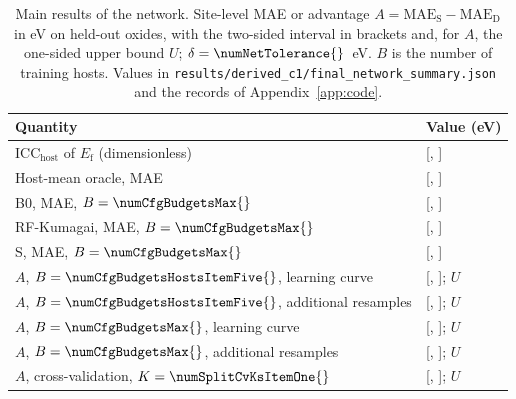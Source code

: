 \begin{table}[H]
\caption{Main results of the network. Site-level MAE or advantage $A = \mathrm{MAE}_\mathrm{S} - \mathrm{MAE}_\mathrm{D}$ in eV on held-out oxides, with the two-sided \pctci{} interval in brackets and, for $A$, the one-sided upper bound $U$; $\delta = \numNetTolerance{}$~eV. $B$ is the number of training hosts. Values in \texttt{results/derived\_c1/final\_network\_summary.json} and the records of Appendix~\ref{app:code}.\label{tab:headline}}
\centering
\small
\begin{tabularx}{\linewidth}{Xl}
\toprule
Quantity & Value (eV) \\
\midrule
$\mathrm{ICC}_\mathrm{host}$ of $E_\mathrm{f}$ (dimensionless) & \numVarianceDecompositionHostIcc{} [\numVarianceDecompositionHostIccCiLo{}, \numVarianceDecompositionHostIccCiHi{}] \\
Host-mean oracle, MAE & \numHostMeanOracleAggregateMaeMean{} [\numHostMeanOracleAggregateMaeCiLo{}, \numHostMeanOracleAggregateMaeCiHi{}] \\
B0, MAE, $B = \numCfgBudgetsMax{}$ & \numNetSixHundredFiftyFourMaeBZero{} [\numNetSixHundredFiftyFourMaeBZeroLo{}, \numNetSixHundredFiftyFourMaeBZeroHi{}] \\
RF-Kumagai, MAE, $B = \numCfgBudgetsMax{}$ & \numNetSixHundredFiftyFourMaeRf{} [\numNetSixHundredFiftyFourMaeRfLo{}, \numNetSixHundredFiftyFourMaeRfHi{}] \\
S, MAE, $B = \numCfgBudgetsMax{}$ & \numNetSixHundredFiftyFourMaeS{} [\numNetSixHundredFiftyFourMaeSLo{}, \numNetSixHundredFiftyFourMaeSHi{}] \\
$A$, $B = \numCfgBudgetsHostsItemFive{}$, learning curve & \numNetFourHundredA{} [\numNetFourHundredALo{}, \numNetFourHundredAHi{}]; $U$ \numNetFourHundredAUpper{} \\
$A$, $B = \numCfgBudgetsHostsItemFive{}$, additional resamples & \numNetFourHundredThirtyByFiveA{} [\numNetFourHundredThirtyByFiveALo{}, \numNetFourHundredThirtyByFiveAHi{}]; $U$ \numNetFourHundredThirtyByFiveAUpper{} \\
$A$, $B = \numCfgBudgetsMax{}$, learning curve & \numNetSixHundredFiftyFourA{} [\numNetSixHundredFiftyFourALo{}, \numNetSixHundredFiftyFourAHi{}]; $U$ \numNetSixHundredFiftyFourAUpper{} \\
$A$, $B = \numCfgBudgetsMax{}$, additional resamples & \numNetHeadlineA{} [\numNetHeadlineALo{}, \numNetHeadlineAHi{}]; $U$ \numNetHeadlineAUpper{} \\
$A$, cross-validation, $K = \numSplitCvKsItemOne{}$ & \numNetCvTenA{} [\numNetCvTenALo{}, \numNetCvTenAHi{}]; $U$ \numNetCvTenAUpper{} \\

\end{tabularx}
\end{table}

